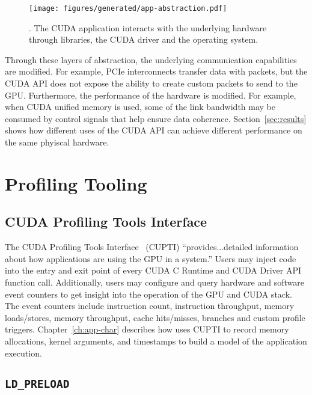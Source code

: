 \begin{figure}[ht]
    \centering
    \texttt{[image: figures/generated/app-abstraction.pdf]}
    \caption[]{. The CUDA application interacts with the underlying hardware through libraries, the CUDA driver and the operating system.}
    \label{fig:app-abstraction}
\end{figure}

Through these layers of abstraction, the underlying communication capabilities are modified.
For example, PCIe interconnects transfer data with packets, but the CUDA API does not expose the ability to create custom packets to send to the GPU.
Furthermore, the performance of the hardware is modified.
For example, when CUDA unified memory is used, some of the link bandwidth may be consumed by control signals that help ensure data coherence.
Section~\ref{sec:results} shows how different uses of the CUDA API can achieve different performance on the same phyiscal hardware.


\section{Profiling Tooling}
\label{sec:profiling}

\subsection{CUDA Profiling Tools Interface}
\label{sec:cupti}

The CUDA Profiling Tools Interface~\cite{nvidia2017cupti} (CUPTI) ``provides...detailed information about how applications are using the GPU in a system.''
Users may inject code into the entry and exit point of every CUDA C Runtime and CUDA Driver API function call.
Additionally, users may configure and query hardware and software event counters to get insight into the operation of the GPU and CUDA stack.
The event counters include instruction count, instruction throughput, memory loads/stores, memory throughput, cache hits/misses, branches and custom profile triggers.
Chapter~\ref{ch:app-char} describes how  uses CUPTI to record memory allocations, kernel arguments, and timestamps to build a model of the application execution.

\subsection{\texttt{LD\_PRELOAD}}
\label{sec:ldpreload}

